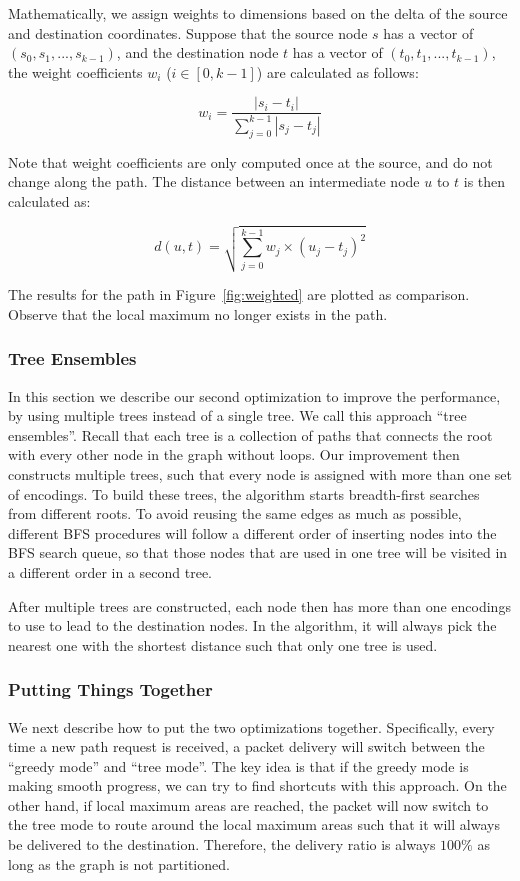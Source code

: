 Mathematically, we assign weights to dimensions based on the delta of the source and destination coordinates. Suppose that the source node $s$ has a vector of $(s_0, s_1, ..., s_{k-1})$, and the destination node $t$ has a vector of $(t_0, t_1, ..., t_{k-1})$, the weight coefficients $w_i$ ($i \in [0,k-1]$) are calculated as follows:

\[
w_i = \frac{|s_i-t_i|}{\sum_{j=0}^{k-1} |s_j-t_j|}
\]

Note that weight coefficients are only computed once at the source, and do not change along the path. The distance between an intermediate node $u$ to $t$ is then calculated as:

\[
d(u,t) = \sqrt{\sum_{j=0}^{k-1} w_j \times(u_j-t_j)^2}
\]


The results for the path in Figure~\ref{fig:weighted} are plotted as comparison. Observe that the local maximum no longer exists in the path.


\subsubsection{Tree Ensembles}

In this section we describe our second optimization to improve the performance, by using multiple trees instead of a single tree. We call this approach ``tree ensembles''. Recall that each tree is a collection of paths that connects the root with every other node in the graph without loops. Our improvement then constructs multiple trees, such that every node is assigned with more than one set of encodings. To build these trees, the algorithm starts breadth-first searches from different roots. To avoid reusing the same edges as much as possible, different BFS procedures will follow a different order of inserting nodes into the BFS search queue, so that those nodes that are used in one tree will be visited in a different order in a second tree.

After multiple trees are constructed, each node then has more than one encodings to use to lead to the destination nodes. In the algorithm, it will always pick the nearest one with the shortest distance such that only one tree is used.


\subsubsection{Putting Things Together}

We next describe how to put the two optimizations together. Specifically, every time a new path request is received, a packet delivery will switch between the ``greedy  mode'' and ``tree mode''. The key idea is that if the greedy mode is making smooth progress, we can try to find shortcuts with this approach. On the other hand, if local maximum areas are reached, the packet will now switch to the tree mode to route around the local maximum areas such that it will always be delivered to the destination. Therefore, the delivery ratio is always $100\%$ as long as the graph is not partitioned.  